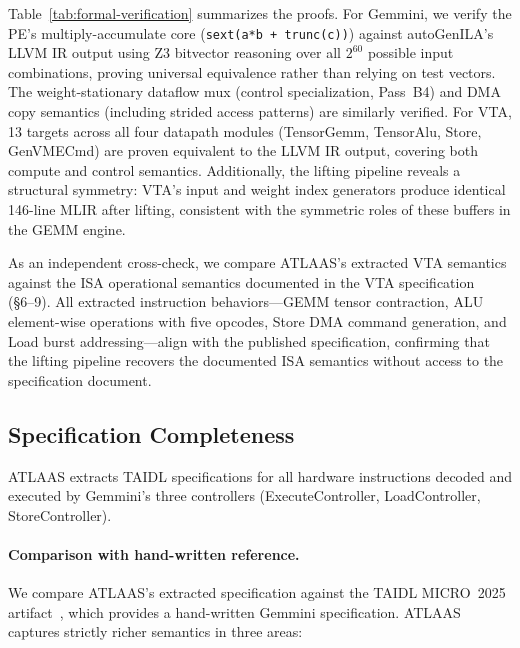 Table~\ref{tab:formal-verification} summarizes the proofs.
For Gemmini, we verify the PE's multiply-accumulate core (\texttt{sext(a*b + trunc(c))}) against autoGenILA's LLVM IR output using Z3 bitvector reasoning over all $2^{60}$ possible input combinations, proving universal equivalence rather than relying on test vectors.
The weight-stationary dataflow mux (control specialization, Pass~B4) and DMA copy semantics (including strided access patterns) are similarly verified.
For VTA, 13 targets across all four datapath modules (TensorGemm, TensorAlu, Store, GenVMECmd) are proven equivalent to the LLVM IR output, covering both compute and control semantics.
Additionally, the lifting pipeline reveals a structural symmetry: VTA's input and weight index generators produce identical 146-line MLIR after lifting, consistent with the symmetric roles of these buffers in the GEMM engine.

As an independent cross-check, we compare ATLAAS's extracted VTA semantics against the ISA operational semantics documented in the VTA specification~\cite{vta} (\S6--9).
All extracted instruction behaviors---GEMM tensor contraction, ALU element-wise operations with five opcodes, Store DMA command generation, and Load burst addressing---align with the published specification, confirming that the lifting pipeline recovers the documented ISA semantics without access to the specification document.

\subsection{Specification Completeness}
\label{subsec:completeness}

ATLAAS extracts TAIDL specifications for all hardware instructions decoded and executed by Gemmini's three controllers (ExecuteController, LoadController, StoreController).

\paragraph{Comparison with hand-written reference.}
We compare ATLAAS's extracted specification against the TAIDL MICRO~2025 artifact~\cite{taidl-ae-micro2025}, which provides a hand-written Gemmini specification.
ATLAAS captures strictly richer semantics in three areas:

